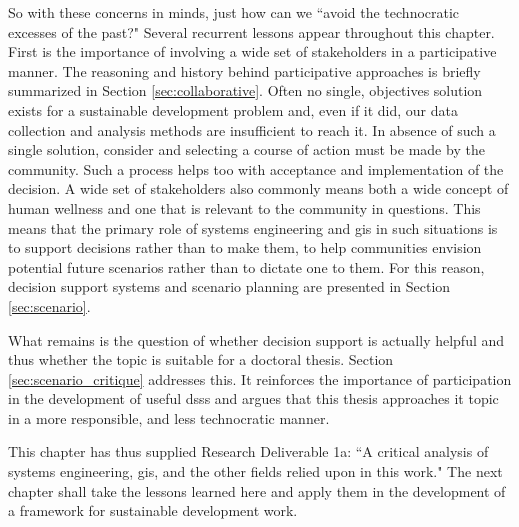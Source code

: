 So with these concerns in minds, just how can we ``avoid the technocratic excesses of the past?" Several recurrent lessons appear throughout this chapter. First is the importance of involving a wide set of stakeholders in a participative manner. The reasoning and history behind participative approaches is briefly summarized in Section \ref{sec:collaborative}. Often no single, objectives solution exists for a sustainable development problem and, even if it did, our data collection and analysis methods are insufficient to reach it. In absence of such a single solution, consider and selecting a course of action must be made by the community. Such a process helps too with acceptance and implementation of the decision. A wide set of stakeholders also commonly means both a wide concept of human wellness and one that is relevant to the community in questions. This means that the primary role of systems engineering and \ac{gis} in such situations is to support decisions rather than to make them, to help communities envision potential future scenarios rather than to dictate one to them. For this reason, decision support systems and scenario planning are presented in Section \ref{sec:scenario}.

What remains is the question of whether decision support is actually helpful and thus whether the topic is suitable for a doctoral thesis. Section \ref{sec:scenario_critique} addresses this. It reinforces the importance of participation in the development of useful \acp{dss} and argues that this thesis approaches it topic in a more responsible, and less technocratic manner. 

This chapter has thus supplied Research Deliverable 1a: ``A critical analysis of systems engineering, \ac{gis}, and the other fields relied upon in this work." The next chapter shall take the lessons learned here and apply them in the development of a framework for sustainable development work.